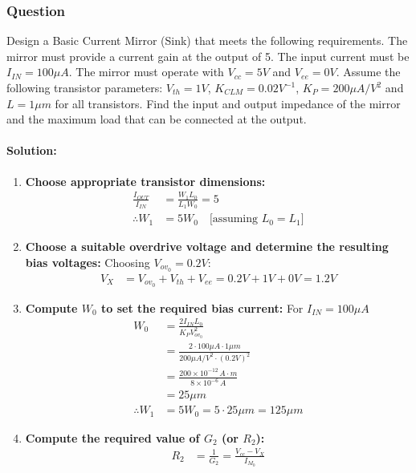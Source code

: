 \subsubsection{Question}
Design a Basic Current Mirror (Sink) that meets
the following requirements. The mirror must provide
a current gain at the output of 5. The input current
must be $I_{IN} = 100 \mu A$. The mirror must operate
with $V_{cc} = 5V$ and $V_{ee} = 0V$. Assume the
following transistor parameters: $V_{th} = 1V$,
$K_{CLM} = 0.02 V^{-1}$, $K_P = 200 \mu A/V^2$ and
$L = 1 \mu m$ for all transistors. Find the input and
output impedance of the mirror and the maximum load
that can be connected at the output.
\paragraph{Solution:}
\begin{enumerate}
  \item \textbf{Choose appropriate transistor dimensions:}
    \begin{align*}
      \frac{I_{OUT}}{I_{IN}} &= \frac{W_1 L_0}{L_1 W_0} = 5 \\
      \therefore W_1 &= 5 W_0 \quad \text{[assuming } L_0 = L_1 \text{]}
    \end{align*}
  \item \textbf{Choose a suitable overdrive voltage and determine
    the resulting bias voltages:}
    Choosing \(V_{ov_0} = 0.2V\):
    \begin{align*}
      V_{X} &= V_{ov_0} + V_{th} + V_{ee} = 0.2V + 1V + 0V = 1.2V
    \end{align*}
  \item \textbf{Compute $W_0$ to set the required bias current:} For $I_{IN} = 100 \mu A$
    \begin{align*}
      W_0 &= \frac{2 I_{IN} L_0}{K_P V_{ov_0}^2} \\
          &= \frac{2 \cdot 100 \mu A \cdot 1 \mu m}{200 \mu A/V^2 \cdot (0.2V)^2} \\
          &= \frac{200 \times 10^{-12} \, A \cdot m}{8 \times 10^{-6} \, A} \\
          &= 25 \mu m \\
      \therefore W_1 &= 5 W_0 = 5 \cdot 25 \mu m = 125 \mu m
    \end{align*}
  \item \textbf{Compute the required value of $G_2$ (or $R_2$):}
    \begin{align*}
      R_2 &= \frac{1}{G_2} = \frac{V_{cc} - V_{X}}{I_{M_0}} \\

\end{align*}
\end{enumerate}
